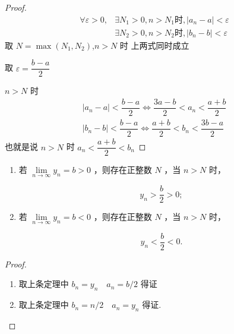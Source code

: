 \begin{proof}
	\begin{align*}
		\forall \varepsilon>0 ,&\exists N_1>0 , n>N_1 \textbf{时} ,\left|a_n-a\right|<\varepsilon\\
		&\exists N_2>0 ,n>N_2 \textbf{时} ,\left|b_n-b\right|<\varepsilon
	\end{align*}
	取 $N=\max \left(N_1, N_2\right)$,$ n>N$ 时 上两式同时成立
	
	取 $\varepsilon=\dfrac{b-a}{2} $
	
	$n>N$ 时
	\begin{align*}
		\left|a_n-a\right|<\dfrac{b-a}{2} \Leftrightarrow \dfrac{3 a-b}{2}<a_n<\dfrac{a+b}{2}\\
		|b_n-b|<\dfrac{b-a}{2} \Leftrightarrow \dfrac{a+b}{2}<b_n<\dfrac{3 b-a}{2}
	\end{align*}
	也就是说 $n>N$ 时 $ a_n<\dfrac{a+b}{2}<b_n$
	
\end{proof}
\begin{corollary}
	\begin{enumerate}
		\item 若 $\lim\limits _{n \rightarrow \infty} y_n=b>0$ ，则存在正整数 $N$ ，当 $n>N$ 时，
		
		$$
		y_n>\dfrac{b}{2}>0 ;
		$$
		\item 若 $\lim\limits_{n \rightarrow \infty} y_n=b<0$ ，则存在正整数 $N$ ，当 $n>N$ 时，
		
		$$
		y_n<\dfrac{b}{2}<0 .
		$$
	\end{enumerate}
	
\end{corollary}
\begin{proof}
	\begin{enumerate}
		\item 取上条定理中 $b_n=y_n \quad a_n=b / 2$ 得证
		\item 取上条定理中 $b_n=n / 2 \quad a_n=y_n$ 得证.
	\end{enumerate}
\end{proof}


